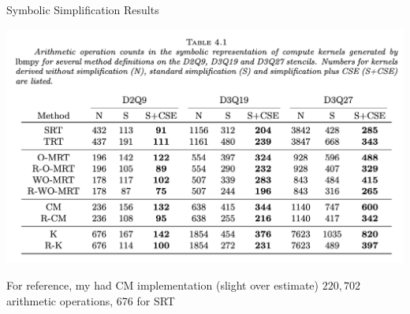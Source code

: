 \begin{frame}{Symbolic Simplification Results}
  \centering
  \begin{center}
    \includegraphics[width=0.8\linewidth]{arith_table.png}
  \end{center}
  For reference, my had \textsc{CM} implementation (slight over estimate) $220,702$ arithmetic operations, 676 for \textsc{SRT}
\end{frame}



